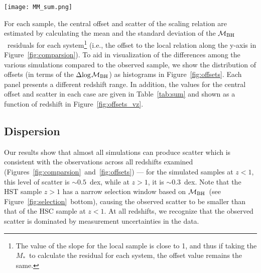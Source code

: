 \documentclass[twocolumn]{aastex631}
\def\smass{{$M_*$}}
\def\mbh{$\mathcal M_{\rm BH}$}
\begin{document}
\begin{figure*}
\centering
\texttt{[image: MM\_sum.png]}
\caption{\label{fig:comparsion} 
Black hole mass versus stellar mass for both the observational (small orange circles) and simulated (small colored circles) samples. Each row pertains to a particular simulation as labelled. The panels, from left to right, show different redshift bins. The black line in each panel indicates the local relation adopted by~\citet{Ding2020}. The background cloud (in green and yellow) shows the intrinsic simulation number density before injecting random noise and applying selection effects. Only TNG100 is presented here since TNG300 presents very similar results.
}
\end{figure*} 

For each sample, the central offset and scatter of the scaling relation are estimated by calculating the mean and the standard deviation of the \mbh\ residuals for each system\footnote{The value of the slope for the local sample is close to 1, and thus if taking the \smass\ to calculate the residual for each system, the offset value remains the same.} (i.e., the offset to the local relation along the y-axis in Figure~\ref{fig:comparsion}).  To aid in visualization of the differences among the various simulations compared to the observed sample, we show the distribution of offsets (in terms of the $\Delta{\rm log}$\mbh) as histograms in Figure~\ref{fig:offsets}. Each panel presents a different redshift range. In addition, the values for the central offset and scatter in each case are given in Table~\ref{tab:sum} and shown as a function of redshift in Figure~\ref{fig:offsets_vz}.

\subsection{Dispersion}

Our results show that almost all simulations can produce scatter which is consistent with the observations across all redshifts examined (Figures~\ref{fig:comparsion}~and~\ref{fig:offsets}) --- for the simulated samples at $z<1$, this level of scatter is $\sim0.5$~dex, while at $z>1$, it is $\sim0.3$~dex. Note that the HST sample $z>1$ has a narrow selection window based on \mbh\ (see Figure~\ref{fig:selection}~bottom), causing the observed scatter to be smaller than that of the HSC sample at $z<1$. At all redshifts, we recognize that the observed scatter is dominated by measurement uncertainties in the data. 
\end{document}
